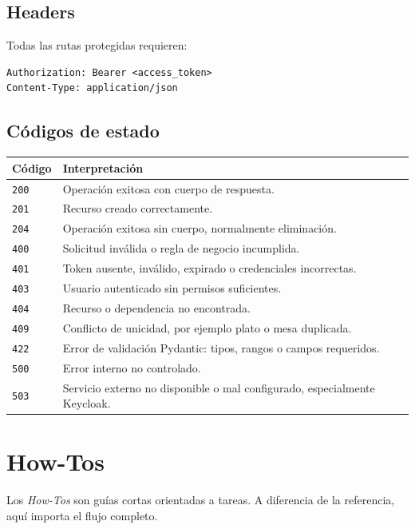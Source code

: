 \documentclass[12pt,letterpaper]{article}
\def\codefile#1{\nolinkurl{#1}}
\begin{document}
\subsection{Headers}

Todas las rutas protegidas requieren:

\begin{lstlisting}
Authorization: Bearer <access_token>
Content-Type: application/json
\end{lstlisting}

\subsection{Códigos de estado}

\begin{longtable}{p{}p{}}
\toprule
\textbf{Código} & \textbf{Interpretación}\\
\midrule
\codefile{200} & Operación exitosa con cuerpo de respuesta.\\
\codefile{201} & Recurso creado correctamente.\\
\codefile{204} & Operación exitosa sin cuerpo, normalmente eliminación.\\
\codefile{400} & Solicitud inválida o regla de negocio incumplida.\\
\codefile{401} & Token ausente, inválido, expirado o credenciales incorrectas.\\
\codefile{403} & Usuario autenticado sin permisos suficientes.\\
\codefile{404} & Recurso o dependencia no encontrada.\\
\codefile{409} & Conflicto de unicidad, por ejemplo plato o mesa duplicada.\\
\codefile{422} & Error de validación Pydantic: tipos, rangos o campos requeridos.\\
\codefile{500} & Error interno no controlado.\\
\codefile{503} & Servicio externo no disponible o mal configurado, especialmente Keycloak.\\
\bottomrule
\end{longtable}

\section{How-Tos}

Los \textit{How-Tos} son guías cortas orientadas a tareas. A diferencia de la referencia, aquí importa el flujo completo.
\end{document}
